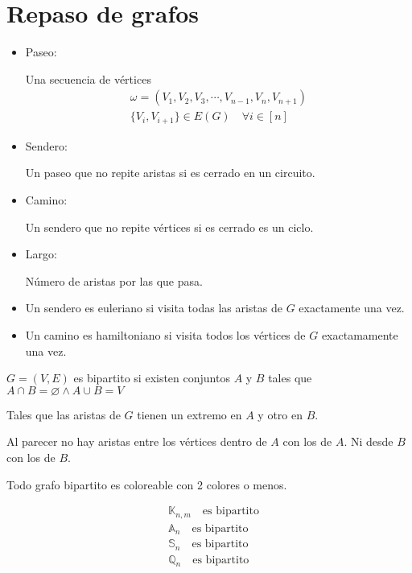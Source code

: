 \documentclass[../main.tex]{subfiles}
\begin{document}
\chapter{Repaso de grafos}%

\thispagestyle{fancy}


\begin{itemize}
	\item Paseo:

		Una secuencia de vértices
		\begin{gather*}
			\omega = (V_1,V_2,V_3,\cdots,V_{n-1},V_n,V_{n+1})\\
			\{V_i, V_{i+1}\} \in E(G)\quad \forall i \in[n]
		\end{gather*}
	\item Sendero:

		Un paseo que no repite aristas si es cerrado en un circuito.
	\item Camino:

		Un sendero que no repite vértices si es cerrado es un ciclo.

	\item Largo:

		Número de aristas por las que pasa.
	\item Un sendero es euleriano si visita todas las aristas de $G$
		exactamente una vez.
	\item Un camino es hamiltoniano si visita todos los vértices de $G$
		exactamamente una vez.
\end{itemize}

$G=(V,E)$ es bipartito si existen conjuntos $A$ y $B$ tales que
$A\cap B = \varnothing \wedge A \cup B = V$

Tales que las aristas de $G$ tienen un extremo en $A$ y otro en $B$.
\begin{figure}[H]
	\centering
	
\end{figure}
Al parecer no hay aristas entre los vértices dentro de $A$ con los de $A$.
Ni desde $B$ con los de $B$.

Todo grafo bipartito es coloreable con 2 colores o menos.

\begin{align*}
	&\mathbb{K}_{n,m}\quad\text{es bipartito}\\
	&\mathbb{A}_n\quad\text{es bipartito}\\
	&\mathbb{S}_n\quad\text{es bipartito}\\
	&\mathbb{Q}_n\quad\text{es bipartito}\\
\end{align*}
\end{document}
